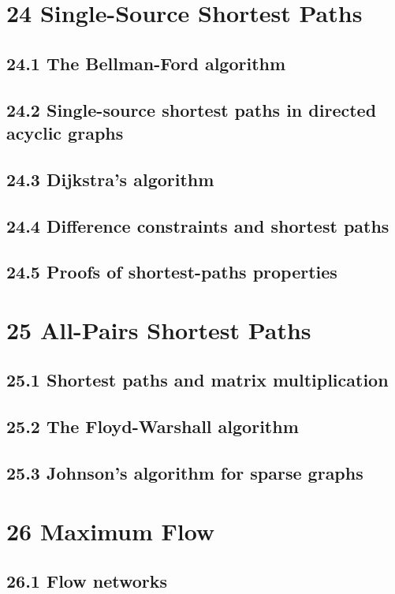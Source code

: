 \documentclass[a4paper]{article}
\begin{document}
\newpage
\section{24 Single-Source Shortest Paths}
\subsection{24.1 The Bellman-Ford algorithm}
\subsection{24.2 Single-source shortest paths in directed acyclic graphs}
\subsection{24.3 Dijkstra’s algorithm}
\subsection{24.4 Difference constraints and shortest paths}
\subsection{24.5 Proofs of shortest-paths properties}

\newpage
\section{25 All-Pairs Shortest Paths}
\subsection{25.1 Shortest paths and matrix multiplication}
\subsection{25.2 The Floyd-Warshall algorithm}
\subsection{25.3 Johnson’s algorithm for sparse graphs}

\newpage
\section{26 Maximum Flow}
\subsection{26.1 Flow networks}
\end{document}
